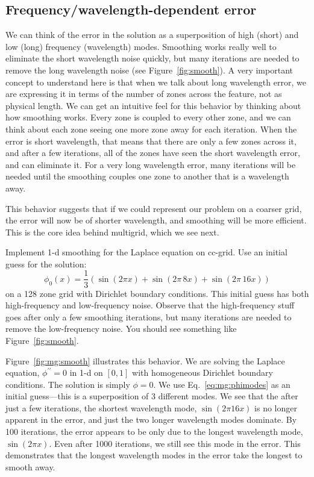 \subsection{Frequency/wavelength-dependent error}

We can think of the error in the solution as a superposition of high
(short) and low (long) frequency (wavelength) modes.  Smoothing works
really well to eliminate the short wavelength noise quickly, but many
iterations are needed to remove the long wavelength noise (see
Figure~\ref{fig:smooth}).  A very important concept to understand here
is that when we talk about long wavelength error, we are expressing it
in terms of the number of zones across the feature, not as physical
length.  We can get an intuitive feel for this behavior by thinking
about how smoothing works.  Every zone is coupled to every other zone,
and we can think about each zone seeing one more zone away for each
iteration.  When the error is short wavelength, that means that there
are only a few zones across it, and after a few iterations, all of the
zones have seen the short wavelength error, and can eliminate it.  For
a very long wavelength error, many iterations will be needed until the
smoothing couples one zone to another that is a wavelength away.

This behavior suggests that if we could represent our problem on a
coarser grid, the error will now be of shorter wavelength, and
smoothing will be more efficient.  This is the core idea behind
multigrid, which we see next.

\begin{exercise}
{Implement 1-d smoothing for the Laplace equation on
  cc-grid.  Use an initial guess for the solution:
  \begin{equation}
    \label{eq:mg:phimodes}
  \phi_0(x) = \frac{1}{3} ( \sin(2\pi x) + \sin(2\pi \, 8 x) + \sin(2\pi \, 16 x) )
  \end{equation}
  on a 128 zone grid with Dirichlet boundary conditions.  This initial
  guess has both high-frequency and low-frequency noise.  Observe that
  the high-frequency stuff goes after only a few smoothing iterations,
  but many iterations are needed to remove the low-frequency noise.
  You should see something like Figure~\ref{fig:smooth}.
}
\end{exercise}

Figure~\ref{fig:mg:smooth} illustrates this behavior.  We are solving
the Laplace equation, $\phi^{\prime\prime} = 0$ in 1-d on $[0,1]$ with
homogeneous Dirichlet boundary conditions.  The solution is simply
$\phi = 0$.  We use Eq.~\ref{eq:mg:phimodes} as an initial guess---this is a superposition
of 3 different modes.  We see that the after just a few iterations, the 
shortest wavelength mode, $\sin(2\pi 16x)$ is no longer apparent in the error,
and just the two longer wavelength modes dominate.  By 100 iterations,
the error appears to be only due to the longest wavelength mode, $\sin(2\pi x)$.
Even after 1000 iterations, we still see this mode in the error.  This 
demonstrates that the longest wavelength modes in the error take the
longest to smooth away.

